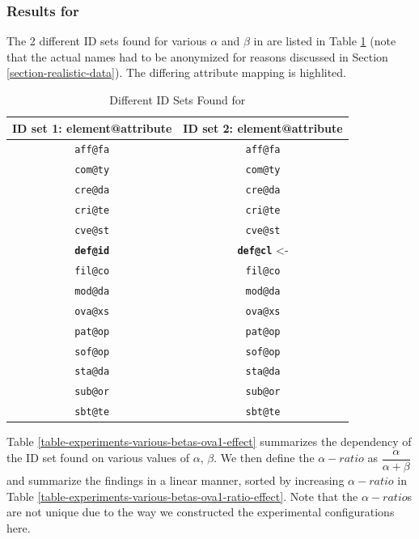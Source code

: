 \subsubsection{Results for }

The 2 different ID sets found for various $\alpha$ and $\beta$ in  are listed in Table \ref{table-experiments-various-betas-ova1} (note that the actual names had to be anonymized for reasons discussed in Section \ref{section-realistic-data}). The differing attribute mapping is highlited.

\begin{table}
  \caption{Different ID Sets Found for }
  \bigskip
  \label{table-experiments-various-betas-ova1}
  \centering
  \begin{tabular}{c || c}
    ID set \textbf{1}: element@attribute & ID set \textbf{2}: element@attribute \\
    \hline
    \texttt{aff@fa} & \texttt{aff@fa} \\
    \texttt{com@ty} & \texttt{com@ty} \\
    \texttt{cre@da} & \texttt{cre@da} \\
    \texttt{cri@te} & \texttt{cri@te} \\
    \texttt{cve@st} & \texttt{cve@st} \\
    \texttt{\textbf{def@id}} & \texttt{\textbf{def@cl}} <- \\ %
    \texttt{fil@co} & \texttt{fil@co} \\
    \texttt{mod@da} & \texttt{mod@da} \\
    \texttt{ova@xs} & \texttt{ova@xs} \\
    \texttt{pat@op} & \texttt{pat@op} \\
    \texttt{sof@op} & \texttt{sof@op} \\
    \texttt{sta@da} & \texttt{sta@da} \\
    \texttt{sub@or} & \texttt{sub@or} \\
    \texttt{sbt@te} & \texttt{sbt@te} \\
  \end{tabular}
\end{table}

Table \ref{table-experiments-various-betas-ova1-effect} summarizes the dependency of the ID set found on various values of $\alpha$, $\beta$. We then define the $\alpha-ratio$ as $ \dfrac{\alpha}{\alpha + \beta} $ and summarize the findings in a linear manner, sorted by increasing $\alpha-ratio$ in Table \ref{table-experiments-various-betas-ova1-ratio-effect}. Note that the $\alpha-ratio$s are not unique due to the way we constructed the experimental configurations here.

